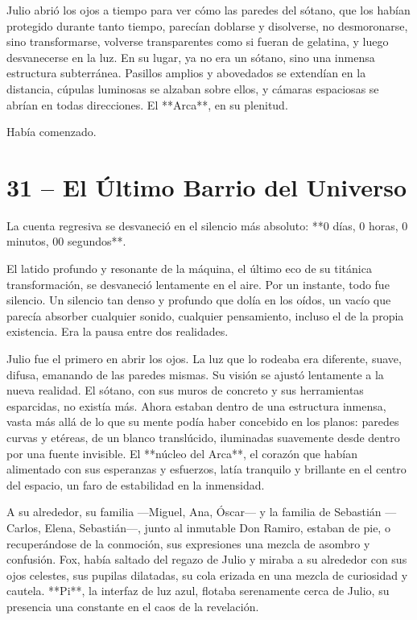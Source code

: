 \documentclass[a4paper,12pt]{book}
\begin{document}
Julio abrió los ojos a tiempo para ver cómo las paredes del sótano, que los habían protegido durante tanto tiempo, parecían doblarse y disolverse, no desmoronarse, sino transformarse, volverse transparentes como si fueran de gelatina, y luego desvanecerse en la luz. En su lugar, ya no era un sótano, sino una inmensa estructura subterránea. Pasillos amplios y abovedados se extendían en la distancia, cúpulas luminosas se alzaban sobre ellos, y cámaras espaciosas se abrían en todas direcciones. El **Arca**, en su plenitud.

Había comenzado.

\cleardoublepage %

\chapter*{31 – El Último Barrio del Universo}

La cuenta regresiva se desvaneció en el silencio más absoluto: **0 días, 0 horas, 0 minutos, 00 segundos**.

El latido profundo y resonante de la máquina, el último eco de su titánica transformación, se desvaneció lentamente en el aire. Por un instante, todo fue silencio. Un silencio tan denso y profundo que dolía en los oídos, un vacío que parecía absorber cualquier sonido, cualquier pensamiento, incluso el de la propia existencia. Era la pausa entre dos realidades.

Julio fue el primero en abrir los ojos. La luz que lo rodeaba era diferente, suave, difusa, emanando de las paredes mismas. Su visión se ajustó lentamente a la nueva realidad. El sótano, con sus muros de concreto y sus herramientas esparcidas, no existía más. Ahora estaban dentro de una estructura inmensa, vasta más allá de lo que su mente podía haber concebido en los planos: paredes curvas y etéreas, de un blanco translúcido, iluminadas suavemente desde dentro por una fuente invisible. El **núcleo del Arca**, el corazón que habían alimentado con sus esperanzas y esfuerzos, latía tranquilo y brillante en el centro del espacio, un faro de estabilidad en la inmensidad.

A su alrededor, su familia —Miguel, Ana, Óscar— y la familia de Sebastián —Carlos, Elena, Sebastián—, junto al inmutable Don Ramiro, estaban de pie, o recuperándose de la conmoción, sus expresiones una mezcla de asombro y confusión. Fox, había saltado del regazo de Julio y miraba a su alrededor con sus ojos celestes, sus pupilas dilatadas, su cola erizada en una mezcla de curiosidad y cautela. **Pi**, la interfaz de luz azul, flotaba serenamente cerca de Julio, su presencia una constante en el caos de la revelación.
\end{document}
